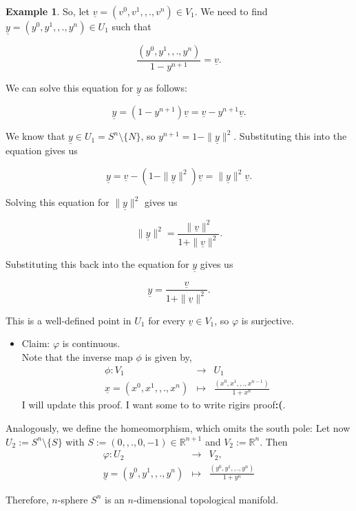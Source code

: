 \documentclass[
]{book}
\providecommand{\tightlist}{%
  \setlength{\itemsep}{0pt}\setlength{\parskip}{0pt}}
\theoremstyle{definition}
\theoremstyle{definition}
\newtheorem{example}{Example}[chapter]
\theoremstyle{definition}
\theoremstyle{definition}
\theoremstyle{remark}
\begin{document}
\begin{example}
So, let \(\underline{v} = (v^0, v^1, ,., v^n) \in V_1\). We need to find \(\underline{y} = (y^0, y^1, ,., y^n) \in U_1\) such that

\[\frac{(y^0, y^1, ,., y^n)}{1-y^{n+1}} = \underline{v}.\]

We can solve this equation for \(\underline{y}\) as follows:

\[\underline{y} = (1-y^{n+1})\underline{v} = \underline{v} - y^{n+1}\underline{v}.\]

We know that \(\underline{y} \in U_1 = S^n \setminus \{N\}\), so \(y^{n+1} = 1 - \|\underline{y}\|^2\). Substituting this into the equation gives us

\[\underline{y} = \underline{v} - (1 - \|\underline{y}\|^2)\underline{v} = \|\underline{y}\|^2\underline{v}.\]

Solving this equation for \(\|\underline{y}\|^2\) gives us

\[\|\underline{y}\|^2 = \frac{\|\underline{v}\|^2}{1 + \|\underline{v}\|^2}.\]

Substituting this back into the equation for \(\underline{y}\) gives us

\[\underline{y} = \frac{\underline{v}}{1 + \|\underline{v}\|^2}.\]

This is a well-defined point in \(U_1\) for every \(\underline{v} \in V_1\), so \(\varphi\) is surjective.

\begin{itemize}
\tightlist
\item
  Claim: \(\varphi\) is continuous.\\
  Note that the inverse map \(\phi\) is given by,
  \begin{eqnarray}
  \phi : V_1 &\rightarrow & U_1\\
  \underline{x}= (x^0, x^1, ,. , x^n) &\mapsto & \frac{(x^0,x^1,,.,x^{n-1})}{1 + x^n} 
  \end{eqnarray}
  {I will update this proof. I want some to to write rigirs proof\textbf{:(}}.
\end{itemize}

Analogously, we define the homeomorphism, which omits the south pole:
Let now \(U_2 := S^n \setminus \{S\}\) with \(S := ( 0,,. , 0, -1) \in \mathbb{R}^{n+1}\) and \(V_2 := \mathbb{R}^n\).
Then
\begin{eqnarray}
\varphi : U_2 &\rightarrow & V_2,\\
\underline{y}= (y^0, y^1, ,. , y^n) &\mapsto & \frac{(y^0,y^1,,.,y^n)}{1 + y^n} 
\end{eqnarray}

Therefore, \(n\)-sphere \(S^n\) is an \(n\)-dimensional topological manifold.
\end{example}
\end{document}
